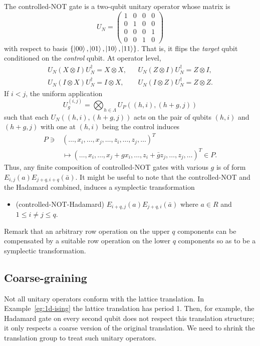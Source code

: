 The controlled-NOT gate is a two-qubit unitary operator whose matrix is
\[
U_N =
 \begin{pmatrix}
  1 & 0 & 0 & 0 \\
  0 & 1 & 0 & 0 \\
  0 & 0 & 0 & 1 \\
  0 & 0 & 1 & 0
 \end{pmatrix}
\]
with respect to basis $\{ \left| {00} \right\rangle, \left| {01} \right\rangle, \left| {10} \right\rangle, \left| {11} \right\rangle \}$.
That is, it flips the {\em target} qubit conditioned on the {\em control} qubit.
At operator level,
\begin{align*}
U_N (X \otimes I ) U_N^\dagger = X \otimes X, & &
U_N (Z \otimes I ) U_N^\dagger = Z \otimes I, \\
U_N (I \otimes X ) U_N^\dagger = I \otimes X, & &
U_N (I \otimes Z ) U_N^\dagger = Z \otimes Z.
\end{align*}
If $i < j$, the uniform application
\[
U^{(i,j)}_g = \bigotimes_{h \in \Lambda} U_P( (h,i), (h+g,j) )
\]
such that each $U_N( (h,i), (h+g,j) )$ acts on the pair of qubits $(h,i)$ and $(h+g,j)$
with one at $(h,i)$ being the control
induces
\begin{align*}
P \ni & (\ldots,x_i,\ldots,x_j,\ldots, z_i, \ldots, z_j, \ldots)^T \\
& \mapsto ( \ldots, x_i, \ldots, x_j + g x_i, \ldots, z_i + \bar g z_j, \ldots, z_j, \ldots )^T \in P .
\end{align*}
Thus, any finite composition of controlled-NOT gates with various $g$ is of form $E_{i,j}(a) E_{j+q,i+q}(\bar a)$.
It might be useful to note that the controlled-NOT and the Hadamard combined,
induces a symplectic transformation
\begin{itemize}
\item (controlled-NOT-Hadamard) $E_{i+q,j}(a) E_{j+q,i}(\bar a)$ where $a \in R$ and $ 1 \le i \ne j \le q$.
\end{itemize}

Remark that an arbitrary row operation on the upper $q$ components
can be compensated by a suitable row operation on the lower $q$ components
so as to be a symplectic transformation.


\subsection{Coarse-graining}

Not all unitary operators conform with the lattice translation.
In Example~\ref{eg:1d-ising} the lattice translation has period 1.
Then, for example, the Hadamard gate on every second qubit 
does not respect this translation structure;
it only respects a coarse version of the original translation.
We need to shrink the translation group to treat such unitary operators.

